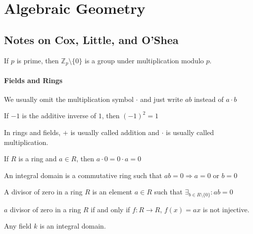 \chapter{Algebraic Geometry}
    \section{Notes on Cox, Little, and O'Shea}
                \begin{theorem}
                    If $p$ is prime, then
                    $\mathbb{Z}_p\setminus \{0\}$ is a group
                    under multiplication modulo $p$.
                \end{theorem}
            \subsubsection{Fields and Rings}
                We usually omit the multiplication symbol $\cdot$ and just
                write $ab$ instead of $a\cdot b$
                \begin{theorem}
                    If $-1$ is the additive inverse of $1$,
                    then $(-1)^2=1$
                \end{theorem}
                In rings and fields, $+$ is usually called addition and
                $\cdot$ is usually called multiplication.
                \begin{theorem}
                    If $R$ is a ring and $a\in R$, then $a\cdot 0=0\cdot a=0$
                \end{theorem}
                \begin{definition}
                    An integral domain is a commutative
                    ring such that $ab=0\Rightarrow a=0$ or $b=0$
                \end{definition}
                \begin{definition}
                    A divisor of zero in a ring $R$ is an element $a\in R$
                    such that $\exists_{b\in R\setminus\{0\}}:ab=0$
                \end{definition}
                \begin{theorem}
                    $a$ divisor of zero in a ring $R$ if and only if
                    $f:R\rightarrow R$, $f(x)=ax$ is not injective.
                \end{theorem}
                \begin{theorem}
                    Any field $k$ is an integral domain.
                \end{theorem}
